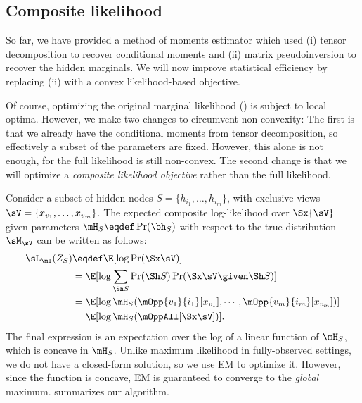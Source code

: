 \subsection{Composite likelihood}
\label{sec:piecewise}

So far, we have provided a method of moments estimator
which used (i) tensor decomposition to recover conditional moments
and (ii) matrix pseudoinversion to recover the hidden marginals.
We will now improve statistical efficiency by replacing (ii)
with a convex likelihood-based objective.

Of course, optimizing the original marginal likelihood () is
subject to local optima.
However, we make two changes to circumvent non-convexity:
The first is that we already have the conditional moments from tensor decomposition,
so effectively a subset of the parameters are fixed.
However, this alone is not enough, for the full likelihood is still non-convex.
The second change is that we will optimize a
\emph{composite likelihood objective} \cite{lindsay88composite}
rather than the full likelihood.


Consider a subset of hidden nodes $S = \{h_{i_1}, \dots, h_{i_m}\}$, with
  exclusive views $\sV = \{x_{v_1}, \dots, x_{v_m}\}$. 
The expected composite log-likelihood over $\Sx{\sV}$ given parameters $\mH_S \eqdef \Pr(\bh_S)$
with respect to the true distribution $\sM_\sV$ can be written as follows:
\begin{align}
  \sL_\ml(Z_S) %
  &\eqdef \E[\log \Pr( \Sx \sV )] \nonumber \\
  &= \E[\log \sum_{\Sh S} \Pr(\Sh S) \Pr( \Sx \sV \given \Sh S )] \nonumber \\
  &= \E[\log \mH_S(\mOpp{v_1}{i_1} [x_{v_1}], \cdots, \mOpp{v_m}{i_m} [x_{v_m}])] \nonumber \\
  &= \E[\log \mH_S(\mOppAll[\Sx\sV])]. \label{eqn:piecewise-obj}
\end{align}
The final expression is an expectation over the log of a linear function of
$\mH_S$, which is concave in $\mH_S$.  
Unlike maximum likelihood in fully-observed settings,
we do not have a closed-form solution, so we use EM to optimize it.
However, since the function is concave, EM is guaranteed to converge to
the \emph{global} maximum.
 summarizes our algorithm.

